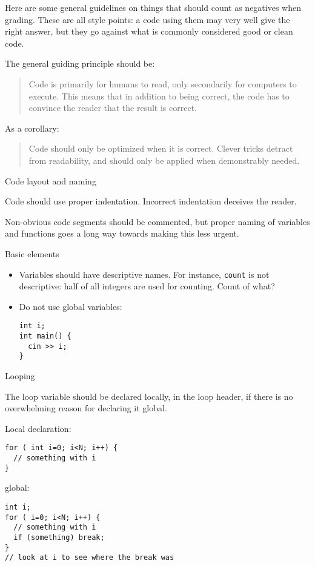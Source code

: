 Here are some general guidelines on things that should
count as negatives when grading.
These are all style points: a code using them may very well
give the right answer, but they go against what is
commonly considered good or clean code.

The general guiding principle should be:
\begin{quote}
  Code is primarily for humans to read, only secondarily
  for computers to execute.
  This means that in addition to being correct,
  the code
  has to convince the reader that the result is correct.
\end{quote}

As a corollary:
\begin{quote}
  Code should only be optimized when it is correct.
  Clever tricks detract from readability,
  and should only be applied when demonstrably needed.
\end{quote}

\lstset{language=C++}

 {Code layout and naming}

Code should use proper indentation.
Incorrect indentation deceives the reader.

Non-obvious code segments should be commented,
but proper naming of variables and functions
goes a long way towards making this less urgent.

 {Basic elements}

\begin{itemize}
\item
  Variables should have descriptive names.
  For instance, \lstinline{count} is not descriptive:
  half of all integers are used for counting.
  Count of what?
\item
  Do not use global variables:
\begin{lstlisting}
int i;
int main() {
  cin >> i;
}
\end{lstlisting}
\end{itemize}


 {Looping}

The loop variable should be declared locally,
in the loop header,
if there is no overwhelming reason for declaring it global.
\begin{multicols}{2}
Local declaration:
\begin{lstlisting}
for ( int i=0; i<N; i++) {
  // something with i
}
\end{lstlisting}
\columnbreak
global:
\begin{lstlisting}
int i;
for ( i=0; i<N; i++) {
  // something with i
  if (something) break;
}
// look at i to see where the break was
\end{lstlisting}
\end{multicols}


